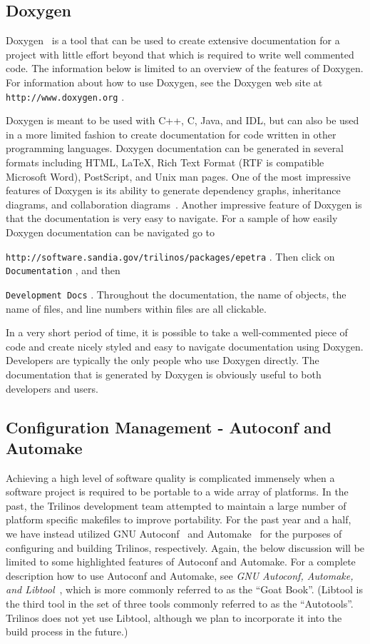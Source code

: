 \documentclass[12pt,relax]{article}
\newcommand{\InlineDirectory}[1]{
  {\hspace{0.01 in}} {\tt #1} {\hspace{0.01 in}}}
\begin{document}
\subsection{Doxygen}

Doxygen~\cite{Doxygen} is a tool that can be used to create 
extensive documentation for a project with little effort beyond that which is 
required to write well commented code.  The information below is limited 
to an overview of the features of Doxygen.  For information about how to use 
Doxygen, see the Doxygen 
web site at \InlineDirectory{http://www.doxygen.org}.  

Doxygen is meant to be used with C++, C, Java, and IDL, but can also be used 
in a more limited fashion to create documentation for code written in other
programming languages.  Doxygen documentation 
can be generated in several formats including HTML, \LaTeX, Rich Text Format 
(RTF is compatible Microsoft Word), PostScript, and
Unix man pages.  One of the most impressive features of Doxygen is its ability 
to generate dependency graphs, inheritance diagrams, and collaboration 
diagrams~\cite{Doxygen}.  Another impressive feature of Doxygen is that the 
documentation is very easy to navigate.  For a sample of how easily Doxygen 
documentation can be navigated go to
\newline
\InlineDirectory{http://software.sandia.gov/trilinos/packages/epetra}.  Then
click on \InlineDirectory{Documentation}, and then 
\InlineDirectory{Development Docs}. 
Throughout the documentation, the name of objects, 
the name of files, and line numbers within files are all clickable.

In a very short period of time, it is possible to take a well-commented piece 
of code and create nicely styled and easy to navigate documentation using 
Doxygen.  Developers are typically the only people who use Doxygen directly.  
The documentation that is generated by Doxygen is obviously useful to both 
developers and users.

\subsection{Configuration Management - Autoconf and Automake}

Achieving a high level of software quality is complicated immensely when 
a software project is required to be portable to a wide array of platforms.
In the past, the Trilinos development team attempted to maintain a large 
number of platform specific makefiles to improve portability.  For the past 
year and a half, we have instead utilized GNU Autoconf~\cite{Autoconf} and 
Automake~\cite{Automake} for 
the purposes of configuring and building Trilinos, respectively.  Again, 
the below discussion will be limited to some highlighted features of Autoconf 
and Automake.  
For a complete description how to use Autoconf and Automake, see 
{\it GNU Autoconf, Automake, and Libtool}~\cite{GoatBook}, which is 
more commonly referred to as the ``Goat Book''.  (Libtool is the third tool 
in the set of three tools commonly referred to as the ``Autotools''.  Trilinos 
does not yet use Libtool, although we plan to incorporate it into the build 
process in the future.)
\end{document}
